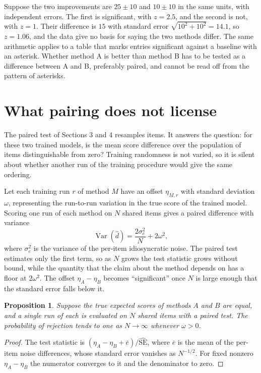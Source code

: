 \documentclass[11pt]{article}
\newtheorem{proposition}{Proposition}
\theoremstyle{definition}
\newcommand{\Var}{\operatorname{Var}}
\begin{document}
Suppose the two improvements are $25\pm10$ and $10\pm10$ in the same units, with independent errors. The first is significant, with $z=2.5$, and the second is not, with $z=1$. Their difference is $15$ with standard error $\sqrt{10^2+10^2}=14.1$, so $z=1.06$, and the data give no basis for saying the two methods differ. The same arithmetic applies to a table that marks entries significant against a baseline with an asterisk. Whether method A is better than method B has to be tested as a difference between A and B, preferably paired, and cannot be read off from the pattern of asterisks.

\section{What pairing does not license}

The paired test of Sections 3 and 4 resamples items. It answers the question: for these two trained models, is the mean score difference over the population of items distinguishable from zero? Training randomness is not varied, so it is silent about whether another run of the training procedure would give the same ordering.

Let each training run $r$ of method $M$ have an offset $\eta_{M,r}$ with standard deviation $\omega$, representing the run-to-run variation in the true score of the trained model. Scoring one run of each method on $N$ shared items gives a paired difference with variance
\[
\Var(\hat d)=\frac{2\sigma_e^2}{N}+2\omega^2,
\]
where $\sigma_e^2$ is the variance of the per-item idiosyncratic noise. The paired test estimates only the first term, so as $N$ grows the test statistic grows without bound, while the quantity that the claim about the method depends on has a floor at $2\omega^2$. The offset $\eta_A-\eta_B$ becomes ``significant'' once $N$ is large enough that the standard error falls below it.

\begin{proposition}
Suppose the true expected scores of methods $A$ and $B$ are equal, and a single run of each is evaluated on $N$ shared items with a paired test. The probability of rejection tends to one as $N\to\infty$ whenever $\omega>0$.
\end{proposition}

\begin{proof}
The test statistic is $(\eta_A-\eta_B+\bar e)/\widehat{\mathrm{SE}}$, where $\bar e$ is the mean of the per-item noise differences, whose standard error vanishes as $N^{-1/2}$. For fixed nonzero $\eta_A-\eta_B$ the numerator converges to it and the denominator to zero. \qedhere
\end{proof}
\end{document}
